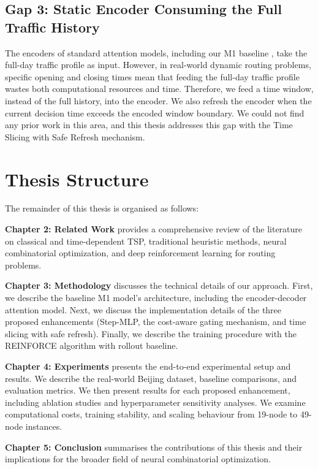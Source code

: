 \subsection{Gap 3: Static Encoder Consuming the Full Traffic History}

The encoders of standard attention models, including our M1 baseline \citep{zhang2023},
take the full-day traffic profile as input. However, in real-world dynamic routing
problems, specific opening and closing times mean that feeding the full-day traffic
profile wastes both computational resources and time. Therefore, we feed a time
window, instead of the full history, into the encoder. We also refresh the
encoder when the current decision time exceeds the encoded window boundary. We could
not find any prior work in this area, and this thesis addresses this gap with the Time
Slicing with Safe Refresh mechanism.

\section{Thesis Structure}

The remainder of this thesis is organised as follows:

\textbf{Chapter 2: Related Work} provides a comprehensive review of the literature on
classical and time-dependent TSP, traditional heuristic methods, neural combinatorial
optimization, and deep reinforcement learning for routing problems.

\textbf{Chapter 3: Methodology} discusses the technical details of our approach. First,
we describe the baseline M1 model's architecture, including the encoder-decoder
attention model. Next, we discuss the implementation details of the three proposed
enhancements (Step-MLP, the cost-aware gating mechanism, and time slicing with safe
refresh). Finally, we describe the training procedure with the REINFORCE algorithm with
rollout baseline.

\textbf{Chapter 4: Experiments} presents the end-to-end experimental setup and results.
We describe the real-world Beijing dataset, baseline comparisons, and evaluation
metrics. We then present results for each proposed enhancement, including ablation
studies and hyperparameter sensitivity analyses. We examine computational costs,
training stability, and scaling behaviour from 19-node to 49-node instances.

\textbf{Chapter 5: Conclusion} summarises the contributions of this thesis and their
implications for the broader field of neural combinatorial optimization.
